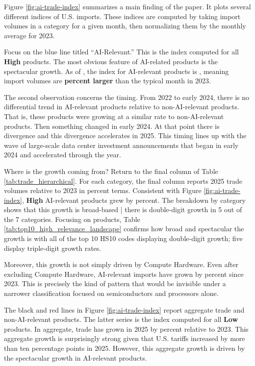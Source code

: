 \documentclass[12pt,pdftex]{article}
\begin{document}
\begin{onehalfspacing}
Figure \ref{fig:ai-trade-index} summarizes a main finding of the paper. It plots several different indices of U.S. imports. These indices are computed by taking import volumes in a category for a given month, then normalizing them by the monthly average for 2023. 

Focus on the blue line titled ``AI-Relevant.'' This is the index computed for all \textbf{High} products. The most obvious feature of AI-related products is the spectacular growth. As of \lastObsDate{}, the index for AI-relevant products is \aiRelevantIndex{}, meaning import volumes are \textbf{\aiRelevantGrowth{} percent larger} than the typical month in 2023. 

The second observation concerns the timing. From 2022 to early 2024, there is no differential trend in AI-relevant products relative to non-AI-relevant products. That is, these products were growing at a similar rate to non-AI-relevant products. Then something changed in early 2024. At that point there is divergence and this divergence accelerates in 2025. This timing lines up with the wave of large-scale data center investment announcements that began in early 2024 and accelerated through the year.

Where is the growth coming from? Return to the final column of Table \ref{tab:trade_hierarchical}. For each category, the final column reports 2025 trade volumes relative to 2023 in percent terms. Consistent with Figure \ref{fig:ai-trade-index}, \textbf{High} AI-relevant products grew by \highAiPctChange{} percent. The breakdown by category shows that this growth is broad-based | there is double-digit growth in 5 out of the 7 categories. Focusing on products, Table \ref{tab:top10_high_relevance_landscape} confirms how broad and spectacular the growth is with all of the top 10 HS10 codes displaying double-digit growth; five display triple-digit growth rates. 

Moreover, this growth is not simply driven by Compute Hardware. Even after excluding Compute Hardware, AI-relevant imports have grown by \aiRelevantExComputeGrowth{} percent since 2023. This is precisely the kind of pattern that would be invisible under a narrower classification focused on semiconductors and processors alone.

The black and red lines in Figure \ref{fig:ai-trade-index} report aggregate trade and non-AI-relevant products. The latter series is the index computed for all \textbf{Low} products. In aggregate, trade has grown in 2025 by \totalTradePctChange{} percent relative to 2023. This aggregate growth is surprisingly strong given that U.S. tariffs increased by more than ten percentage points in 2025. However, this aggregate growth is driven by the spectacular growth in AI-relevant products.


\end{onehalfspacing}
\end{document}
